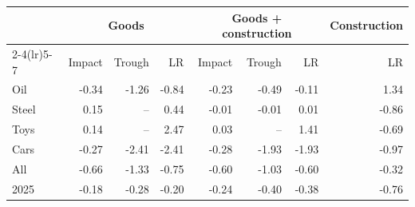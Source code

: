 \begin{tabular}{lrrrrrrr}
\toprule
 & \multicolumn{3}{c}{Goods} & \multicolumn{3}{c}{Goods + construction} & Construction \\
\cmidrule(lr){2-4}\cmidrule(lr){5-7}
 & Impact & Trough & LR & Impact & Trough & LR & LR \\
\midrule
Oil & -0.34 & -1.26 & -0.84 & -0.23 & -0.49 & -0.11 & 1.34 \\
Steel & 0.15 & -- & 0.44 & -0.01 & -0.01 & 0.01 & -0.86 \\
Toys & 0.14 & -- & 2.47 & 0.03 & -- & 1.41 & -0.69 \\
Cars & -0.27 & -2.41 & -2.41 & -0.28 & -1.93 & -1.93 & -0.97 \\
All & -0.66 & -1.33 & -0.75 & -0.60 & -1.03 & -0.60 & -0.32 \\
2025 & -0.18 & -0.28 & -0.20 & -0.24 & -0.40 & -0.38 & -0.76 \\
\bottomrule
\end{tabular}
